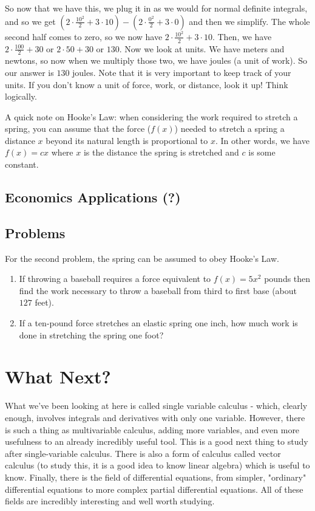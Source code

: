 So now that we have this, we plug it in as we would for normal definite integrals, and so we get $(2\cdot\frac{10^2}{2}+3\cdot 10) - (2\cdot\frac{0^2}{2}+3\cdot 0)$ and then we simplify. 
The whole second half comes to zero, so we now have $2\cdot\frac{10^2}{2}+3\cdot 10$. 
Then, we have $2\cdot \frac{100}{2}+ 30$ or $2\cdot 50 + 30$ or $130$. 
Now we look at units. 
We have meters and newtons, so now when we multiply those two, we have joules (a unit of work). 
So our answer is $130$ joules. 
Note that it is very important to keep track of your units. If you don't know a unit of force, work, or distance, look it up! Think logically.

A quick note on Hooke's Law: when considering the work required to stretch a spring, you can assume that the force ($f(x)$) needed to stretch a spring a distance $x$ beyond its natural length is proportional to $x$. 
In other words, we have $f(x) = cx$ where $x$ is the distance the spring is stretched and $c$ is some constant.
\subsection{Economics Applications (?)}

\subsection{Problems}
For the second problem, the spring can be assumed to obey Hooke's Law.

\begin{enumerate}
    \item If throwing a baseball requires a force equivalent to $f(x) = 5x^2$ pounds then find the work necessary to throw a baseball from third to first base (about $127$ feet).
    \item If a ten-pound force stretches an elastic spring one inch, how much work is done in stretching the spring one foot?
\end{enumerate}

\section{What Next?}

What we've been looking at here is called single variable calculus - which, clearly enough, involves integrals and derivatives with only one variable. 
However, there is such a thing as multivariable calculus, adding more variables, and even more usefulness to an already incredibly useful tool. 
This is a good next thing to study after single-variable calculus. 
There is also a form of calculus called vector calculus (to study this, it is a good idea to know
linear algebra) which is useful to know. 
Finally, there is the field of differential equations, from simpler, "ordinary" differential equations to more complex partial differential equations. 
All of these fields are incredibly interesting and well worth studying.
